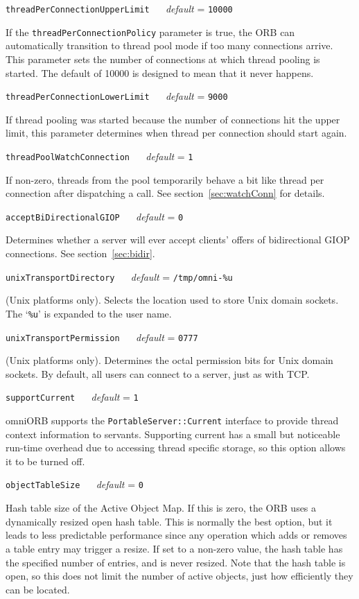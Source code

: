 \documentclass[11pt,twoside,a4paper]{book}
\makeatletter
\newcommand{\type}[1]{\texttt{#1}}
\newcommand{\code}[1]{\texttt{#1}}
\newcommand{\confopt}[2]
  {\vspace{\baselineskip}\par\noindent\code{#1} ~~ \textit{default} =
   \code{#2}}
\renewcommand{\confopt}[2]
  {\vspace{\baselineskip}\par\noindent\code{#1} ~~ \textit{default} =
   \code{#2}\\[-1ex]\@afterheading}
\makeatother
\begin{document}
\confopt{threadPerConnectionUpperLimit}{10000}

If the \code{threadPerConnectionPolicy} parameter is true, the ORB can
automatically transition to thread pool mode if too many connections
arrive. This parameter sets the number of connections at which thread
pooling is started. The default of 10000 is designed to mean that it
never happens.


\confopt{threadPerConnectionLowerLimit}{9000}

If thread pooling was started because the number of connections hit
the upper limit, this parameter determines when thread per connection
should start again.


\confopt{threadPoolWatchConnection}{1}

If non-zero, threads from the pool temporarily behave a bit like
thread per connection after dispatching a call. See
section~\ref{sec:watchConn} for details.


\confopt{acceptBiDirectionalGIOP}{0}

Determines whether a server will ever accept clients' offers of
bidirectional GIOP connections. See section~\ref{sec:bidir}.


\confopt{unixTransportDirectory}{/tmp/omni-\%u}

(Unix platforms only). Selects the location used to store Unix domain
sockets. The `\code{\%u}' is expanded to the user name.


\confopt{unixTransportPermission}{0777}

(Unix platforms only). Determines the octal permission bits for Unix
domain sockets. By default, all users can connect to a server, just as
with TCP.


\confopt{supportCurrent}{1}

omniORB supports the \type{PortableServer::Current} interface to
provide thread context information to servants. Supporting current has
a small but noticeable run-time overhead due to accessing thread
specific storage, so this option allows it to be turned off.


\confopt{objectTableSize}{0}

Hash table size of the Active Object Map. If this is zero, the ORB
uses a dynamically resized open hash table. This is normally the best
option, but it leads to less predictable performance since any
operation which adds or removes a table entry may trigger a resize. If
set to a non-zero value, the hash table has the specified number of
entries, and is never resized. Note that the hash table is open, so
this does not limit the number of active objects, just how efficiently
they can be located.
\end{document}
